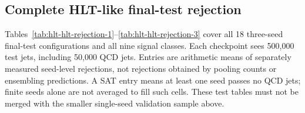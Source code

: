 



\clearpage
\subsection{Complete HLT-like final-test rejection}
\label{sec:hlt-test-rejection-complete}

Tables~\ref{tab:hlt-hlt-rejection-1}--\ref{tab:hlt-hlt-rejection-3} cover
all 18 three-seed final-test configurations and all nine signal classes.
Each checkpoint sees 500,000 test jets, including 50,000 QCD jets. Entries
are arithmetic means of separately measured seed-level rejections, not
rejections obtained by pooling counts or ensembling predictions. A SAT
entry means at least one seed passes no QCD jets; finite seeds alone are
not averaged to fill such cells. These test tables must not be merged with
the smaller single-seed validation sample above.




